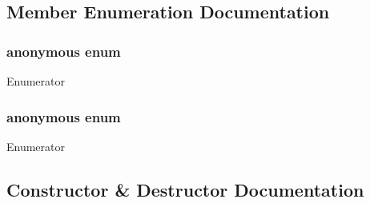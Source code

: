 \subsection{Member Enumeration Documentation}
\hypertarget{class_c_about_dlg_a323e45c9be54c1a27ea680ca8f830e59}{}\subsubsection[{anonymous enum}]{\setlength{\rightskip}{0pt plus 5cm}anonymous enum}\label{class_c_about_dlg_a323e45c9be54c1a27ea680ca8f830e59}
\begin{Desc}
\item[Enumerator]\par
\begin{description}
\item[{\em 
\hypertarget{class_c_about_dlg_a2bf6fe175354c5940fc5a7be4112b763a6770a5e86baf52bc825f7381a62f47eb}{}I\+D\+D\label{class_c_about_dlg_a2bf6fe175354c5940fc5a7be4112b763a6770a5e86baf52bc825f7381a62f47eb}
}]\end{description}
\end{Desc}
\hypertarget{class_c_about_dlg_a2bf6fe175354c5940fc5a7be4112b763}{}\subsubsection[{anonymous enum}]{\setlength{\rightskip}{0pt plus 5cm}anonymous enum}\label{class_c_about_dlg_a2bf6fe175354c5940fc5a7be4112b763}
\begin{Desc}
\item[Enumerator]\par
\begin{description}
\item[{\em 
\hypertarget{class_c_about_dlg_a2bf6fe175354c5940fc5a7be4112b763a6770a5e86baf52bc825f7381a62f47eb}{}I\+D\+D\label{class_c_about_dlg_a2bf6fe175354c5940fc5a7be4112b763a6770a5e86baf52bc825f7381a62f47eb}
}]\end{description}
\end{Desc}


\subsection{Constructor \& Destructor Documentation}
\hypertarget{class_c_about_dlg_a6d1e6a33fef23bee6e75254189d865ce}{}
